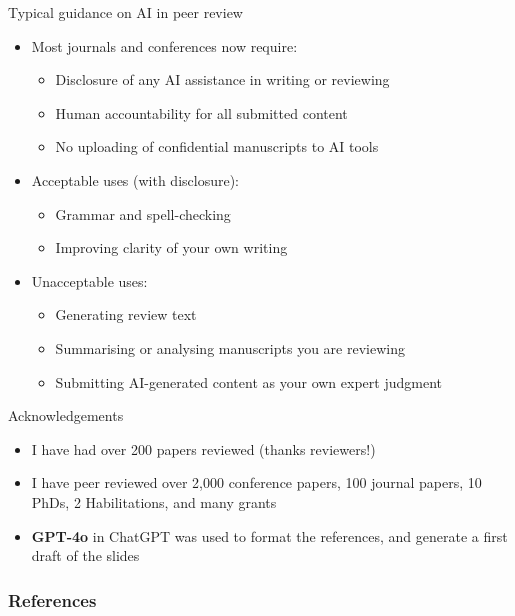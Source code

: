 \documentclass[aspectratio=169]{beamer}
\begin{document}
\begin{frame}{Typical guidance on AI in peer review}
\begin{itemize}
  \item Most journals and conferences now require:
    \begin{itemize}
      \item Disclosure of any AI assistance in writing or reviewing
      \item Human accountability for all submitted content
      \item No uploading of confidential manuscripts to AI tools
    \end{itemize}
  \item Acceptable uses (with disclosure):
    \begin{itemize}
      \item Grammar and spell-checking
      \item Improving clarity of your own writing
    \end{itemize}
  \item Unacceptable uses:
    \begin{itemize}
      \item Generating review text
      \item Summarising or analysing manuscripts you are reviewing
      \item Submitting AI-generated content as your own expert judgment
    \end{itemize}
\end{itemize}
\end{frame}


\begin{frame}{Acknowledgements}

  \begin{itemize}
 \item I have had over 200 papers reviewed (thanks reviewers!)
 \item I have peer reviewed over 2,000 conference papers, 100 journal papers, 10 PhDs, 2 Habilitations, and many grants
  \item \textbf{GPT-4o} in ChatGPT \citep{openai-chatgpt-2025-03-14} was used to format the references, and generate a first draft of the slides
  \aicheck
  \end{itemize}

\end{frame}


\begin{frame}[allowframebreaks]
\frametitle{References}
\printbibliography[heading=none]
\end{frame}
\end{document}
